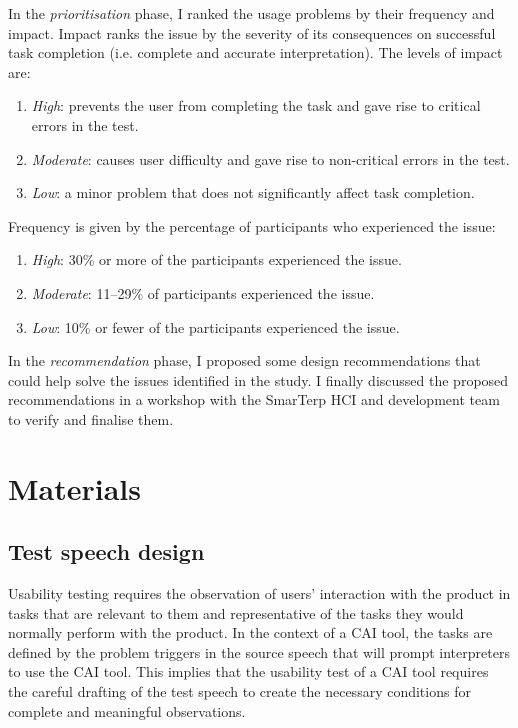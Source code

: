 In the \textit{prioritisation} phase, I ranked the usage problems by their frequency and impact. Impact ranks the issue by the severity of its consequences on successful task completion (i.e. complete and accurate interpretation). The levels of impact are:
\begin{enumerate}
    \item \textit{High}: prevents the user from completing the task and gave rise to critical errors in the test.
    \item \textit{Moderate}: causes user difficulty and gave rise to non-critical errors in the test.
    \item \textit{Low}: a minor problem that does not significantly affect task completion.
\end{enumerate}
Frequency is given by the percentage of participants who experienced the issue: \begin{enumerate}
    \item \textit{High}: 30\% or more of the participants experienced the issue.
    \item \textit{Moderate}: 11--29\% of participants experienced the issue.
    \item \textit{Low}: 10\% or fewer of the participants experienced the issue.
\end{enumerate}
In the \textit{recommendation} phase, I proposed some design recommendations that could help solve the issues identified in the study. I finally discussed the proposed recommendations in a workshop with the SmarTerp HCI and development team to verify and finalise them.

\section{Materials}




\subsection{Test speech design}




Usability testing requires the observation of users’ interaction with the product in tasks that are relevant to them and representative of the tasks they would normally perform with the product. In the context of a CAI tool, the tasks are defined by the problem triggers in the source speech that will prompt interpreters to use the CAI tool. This implies that the usability test of a CAI tool requires the careful drafting of the test speech to create the necessary conditions for complete and meaningful observations.

